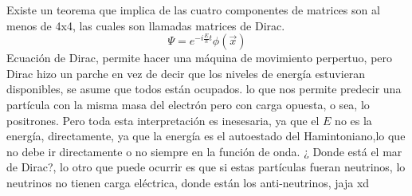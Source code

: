 \documentclass[../main.tex]{subfiles}
\begin{document}
Existe un teorema que implica de las cuatro componentes de matrices son al menos de 4x4, las cuales son llamadas matrices de Dirac. 
\begin{equation}
  \Psi = e^{-i\frac{E}{h}t}\phi(\vec{x})
\end{equation}
Ecuación de Dirac, permite hacer una máquina de movimiento perpertuo, pero Dirac hizo un parche
en vez de decir que los niveles de energía estuvieran disponibles, se asume que todos están ocupados. lo que nos permite predecir una partícula con la misma masa del electrón pero con carga opuesta, o sea, lo positrones. Pero toda esta interpretación es inesesaria, ya que el $E$ no es la energía, directamente, ya que la energía es el autoestado del Hamintoniano,lo que no debe ir directamente o no siempre en la función de onda. ¿ Donde está el mar de Dirac?, lo otro que puede ocurrir es que si estas partículas fueran neutrinos, lo neutrinos no tienen carga eléctrica, donde están los anti-neutrinos, jaja xd  
\end{document}

